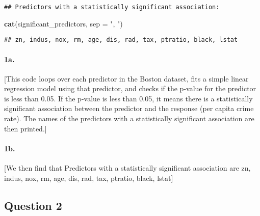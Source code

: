 \documentclass[
]{article}
\newenvironment{Shaded}{\begin{snugshade}}{\end{snugshade}}
\newcommand{\AttributeTok}[1]{\textcolor[rgb]{0.13,0.29,0.53}{#1}}
\newcommand{\FunctionTok}[1]{\textcolor[rgb]{0.13,0.29,0.53}{\textbf{#1}}}
\newcommand{\NormalTok}[1]{#1}
\newcommand{\StringTok}[1]{\textcolor[rgb]{0.31,0.60,0.02}{#1}}
\begin{document}
\begin{verbatim}
## Predictors with a statistically significant association:
\end{verbatim}

\begin{Shaded}
\begin{Highlighting}[]
\FunctionTok{cat}\NormalTok{(significant\_predictors, }\AttributeTok{sep =} \StringTok{", "}\NormalTok{)}
\end{Highlighting}
\end{Shaded}

\begin{verbatim}
## zn, indus, nox, rm, age, dis, rad, tax, ptratio, black, lstat
\end{verbatim}

\hypertarget{a.}{%
\paragraph{1a.}\label{a.}}

{[}This code loops over each predictor in the Boston dataset, fits a
simple linear regression model using that predictor, and checks if the
p-value for the predictor is less than 0.05. If the p-value is less than
0.05, it means there is a statistically significant association between
the predictor and the response (per capita crime rate). The names of the
predictors with a statistically significant association are then
printed.{]}

\hypertarget{b.}{%
\paragraph{1b.}\label{b.}}

{[}We then find that Predictors with a statistically significant
association are zn, indus, nox, rm, age, dis, rad, tax, ptratio, black,
lstat{]}

\hypertarget{question-2}{%
\subsection{Question 2}\label{question-2}}
\end{document}
